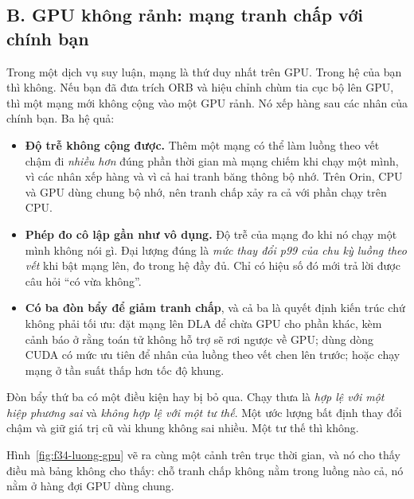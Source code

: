 \documentclass[../../deep_learning.tex]{subfiles}
\begin{document}
\subsection{B. GPU không rảnh: mạng tranh chấp với chính bạn}

Trong một dịch vụ suy luận, mạng là thứ duy nhất trên GPU. Trong hệ của bạn thì không. Nếu bạn đã đưa trích ORB và hiệu chỉnh chùm tia cục bộ lên GPU, thì một mạng mới không cộng vào một GPU rảnh. Nó xếp hàng sau các nhân của chính bạn. Ba hệ quả:

\begin{itemize}
\item \textbf{Độ trễ không cộng được.} Thêm một mạng có thể làm luồng theo vết chậm đi \emph{nhiều hơn} đúng phần thời gian mà mạng chiếm khi chạy một mình, vì các nhân xếp hàng và vì cả hai tranh băng thông bộ nhớ. Trên Orin, CPU và GPU dùng chung bộ nhớ, nên tranh chấp xảy ra cả với phần chạy trên CPU.
\item \textbf{Phép đo cô lập gần như vô dụng.} Độ trễ của mạng đo khi nó chạy một mình không nói gì. Đại lượng đúng là \emph{mức thay đổi p99 của chu kỳ luồng theo vết} khi bật mạng lên, đo trong hệ đầy đủ. Chỉ có hiệu số đó mới trả lời được câu hỏi ``có vừa không''.
\item \textbf{Có ba đòn bẩy để giảm tranh chấp}, và cả ba là quyết định kiến trúc chứ không phải tối ưu: đặt mạng lên DLA để chừa GPU cho phần khác, kèm cảnh báo ở  rằng toán tử không hỗ trợ sẽ rơi ngược về GPU; dùng dòng CUDA có mức ưu tiên để nhân của luồng theo vết chen lên trước; hoặc chạy mạng ở tần suất thấp hơn tốc độ khung.
\end{itemize}

Đòn bẩy thứ ba có một điều kiện hay bị bỏ qua. Chạy thưa là \emph{hợp lệ với một hiệp phương sai} và \emph{không hợp lệ với một tư thế}. Một ước lượng bất định thay đổi chậm và giữ giá trị cũ vài khung không sai nhiều. Một tư thế thì không.

Hình~\ref{fig:f34-luong-gpu} vẽ ra cùng một cảnh trên trục thời gian, và nó cho thấy điều mà bảng không cho thấy: chỗ tranh chấp không nằm trong luồng nào cả, nó nằm ở hàng đợi GPU dùng chung.
\end{document}
